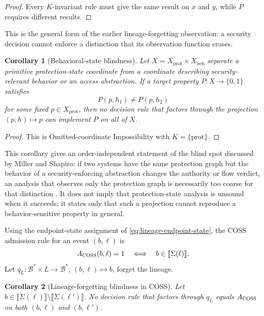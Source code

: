 \documentclass[10pt,twocolumn]{article}
\newcommand{\Model}{\textnormal{\textsc{COSS}}\xspace}
\newcommand{\sem}[1]{\llbracket #1 \rrbracket}
\newcommand{\state}{\Sigma}
\newtheorem{corollary}{Corollary}
\begin{document}
\begin{proof}
Every $K$-invariant rule must give the same result on $x$ and $y$, while $P$
requires different results.
\end{proof}

This is the general form of the earlier lineage-forgetting observation: a
security decision cannot enforce a distinction that its observation function
erases.

\begin{corollary}[Behavioral-state blindness]\label{cor:behavioral-blindness}
Let $X=X_{\mathrm{prot}}\times X_{\mathrm{beh}}$ separate a primitive
protection-state coordinate from a coordinate describing security-relevant
behavior or an access abstraction.  If a target property $P:X\to\{0,1\}$
satisfies
\begin{equation}
  P(p,h_1)\ne P(p,h_2)
\end{equation}
for some fixed $p\in X_{\mathrm{prot}}$, then no decision rule that factors
through the projection $(p,h)\mapsto p$ can implement $P$ on all of $X$.
\end{corollary}

\begin{proof}
This is Omitted-coordinate Impossibility with
$K=\{\mathrm{prot}\}$.
\end{proof}

This corollary gives an order-independent statement of the blind spot discussed
by Miller and Shapiro: if two systems have the same protection graph but the
behavior of a security-enforcing abstraction changes the authority or flow
verdict, an analysis that observes only the protection graph is necessarily too
coarse for that distinction \cite{miller_shapiro2003}.  It does not imply that
protection-state analysis is unsound when it succeeds; it states only that such
a projection cannot reproduce a behavior-sensitive property in general.

Using the endpoint-state assignment of \eqref{eq:lineage-endpoint-state}, the
\Model admission rule for an event $(b,\ell)$ is
\begin{equation}
  A_{\Model}(b,\ell)=1
  \quad\Longleftrightarrow\quad
  b\in\sem{\state(\ell)}.
\end{equation}
Let $q_L:\mathcal{B}^*\times L\to\mathcal{B}^*$,
$(b,\ell)\mapsto b$, forget the lineage.

\begin{corollary}[Lineage-forgetting blindness in \Model]
\label{cor:coss-lineage}
Let $b\in\sem{\state(\ell)}\setminus\sem{\state(\ell')}$. No decision rule
that factors through $q_L$ equals $A_{\Model}$ on both $(b,\ell)$ and
$(b,\ell')$.
\end{corollary}
\end{document}
